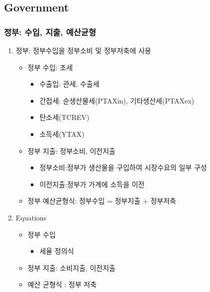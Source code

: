 \documentclass[10pt,compress,slidetop,%
			   hyperref={unicode},xcolor={svgnames},%
			   t]{beamer}
\begin{document}
\subsection{Government}
\begin{frame}
	\frametitle{정부: 수입, 지출, 예산균형}
\begin{enumerate}
\item{정부: 정부수입을 정부소비 및 정부저축에 사용}
		\begin{itemize}
				\item{정부 수입: 조세}
			\begin{itemize}
			\item{수출입: 관세, 수출세}
			\item{간접세: 순생산물세(PTAXin), 기타생산세(PTAXex)}
			\item{탄소세(TCREV)}
			\item{소득세(YTAX)}
			\end{itemize}
		\item{정부 지출: 정부소비, 이전지출}
		    \begin{itemize}
			\item{정부소비:정부가 생산물을 구입하여 시장수요의 일부 구성}
			\item{이전지출:정부가 가계에 소득을 이전}
			\end{itemize}
		\item{정부 예산균형식: 정부수입 = 정부지출 + 정부저축}
	\end{itemize}
\bigskip
\item{Equations}
	\begin{itemize}
	\item{정부 수입}
	\begin{itemize}
	\item{세율 정의식}
	\end{itemize}
	\item{정부 지출: 소비지출, 이전지출}
	\item{예산 균형식 : 정부 저축}
	\end{itemize}
\end{enumerate}		
\end{frame}
\end{document}
